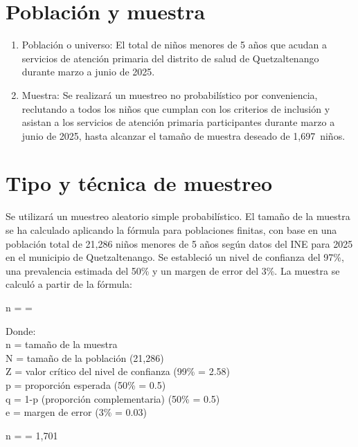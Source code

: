 \documentclass[11pt,letterpaper]{report}
\newcommand{\tiempito}{marzo a junio de 2025}
\newcommand{\muestradeseada}{1,697}
\begin{document}
\section{Población y muestra}

\begin{enumerate}
	\item Población o universo:
		El total de niños menores de 5 años que acudan a servicios de atención
		primaria del distrito de salud de Quetzaltenango durante \tiempito.
	\item Muestra:
		Se realizará un muestreo no probabilístico por conveniencia, reclutando
		a todos los niños que cumplan con los criterios de inclusión y asistan
		a los servicios de atención primaria participantes durante \tiempito,
		hasta alcanzar el tamaño de muestra deseado de \muestradeseada\ niños.
\end{enumerate}

\section{Tipo y técnica de muestreo}
Se utilizará un muestreo aleatorio simple probabilístico. El tamaño de la
muestra se ha calculado aplicando la fórmula para poblaciones finitas, con base
en una población total de 21,286 niños menores de 5 años según datos del INE
para 2025 en el municipio de Quetzaltenango. \cite{INE} Se estableció un nivel
de confianza del 97\%, una prevalencia estimada del 50\% y un margen de error
del 3\%. La muestra se calculó a partir de la fórmula:

\begin{myequation}%
	n =  = 
\end{myequation}
%
Donde: \\
n = tamaño de la muestra \\
N = tamaño de la población (21,286) \\
Z = valor crítico del nivel de confianza (99\% = 2.58) \\
p = proporción esperada (50\% = 0.5) \\
q = 1-p (proporción complementaria) (50\% = 0.5) \\
e = margen de error (3\% = 0.03) \\

\begin{myequation}%
	n =  = 1{,}701 %
\end{myequation}
%
\end{document}

